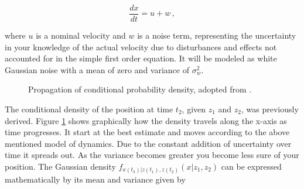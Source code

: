 \begin{equation}\label{}
  \frac{dx}{dt} = u + w\,,
\end{equation}

\noindent
where $u$ is a nominal velocity and $w$ is a noise term, representing the uncertainty in your knowledge of the actual velocity due to disturbances and effects not accounted for in the simple first order equation. It will be modeled as white Gaussian noise with a mean of zero and variance of $\sigma^2_w$.

\begin{figure}
\centering
{}
\caption{Propagation of conditional probability density, adopted from \cite{Maybeck79}.} \label{fig:propagation}
\end{figure}

The conditional density of the position at time $t_2$, given $z_1$ and $z_2$, was previously derived. Figure \ref{fig:propagation} shows graphically how the density travels along the x-axis as time progresses. It start at the best estimate and moves according to the above mentioned model of dynamics. Due to the constant addition of uncertainty over time it spreads out. As the variance becomes greater you become less sure of your position. The Gaussian density $f_{x(t_3)|z(t_1), z(t_2)}(x|z_1, z_2)$ can be expressed mathematically by its mean and variance given by

